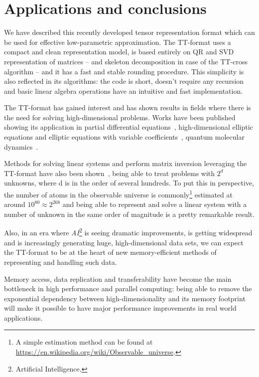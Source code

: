 \chapter{Applications and conclusions}
We have described this recently developed tensor representation format which can be used for effective low-parametric approximation.
The TT-format uses a compact and clean representation model, is based entirely on QR and SVD representation of matrices -- and skeleton decomposition in case of the TT-cross algorithm -- and it has a fast and stable rounding procedure.
This simplicity is also reflected in its algorithms: the code is short, doesn't require any recursion and basic linear algebra operations have an intuitive and fast implementation.

The TT-format has gained interest and has shown results in fields where there is the need for solving high-dimensional problems. Works have been published showing its application in partial differential equations~\cite{khoromskij2011qtt}, high-dimensional elliptic equations and elliptic equations with variable coefficients~\cite{dolgov2010tensor}, quantum molecular dynamics~\cite{khoromskij2010dmrg+}.

Methods for solving linear systems and perform matrix inversion leveraging the TT-format have also been shown~\cite{oseledets2012solution}, being able to treat problems with $2^d$ unknowns, where d is in the order of several hundreds. To put this in perspective, the number of atoms in the observable universe is commonly\footnote{A simple estimation method can be found at \href{https://en.wikipedia.org/wiki/Observable_universe}{https://en.wikipedia.org/wiki/Observable\_universe}.} estimated at around $10^{80} \approx 2^{268}$ and being able to represent and solve a linear system with a number of unknown in the same order of magnitude is a pretty remarkable result.

Also, in an era where \emph{AI}\footnote{Artificial Intelligence.} is seeing dramatic improvements, is getting widespread and is increasingly generating huge, high-dimensional data sets, we can expect the TT-format to be at the heart of new memory-efficient methods of representing and handling such data.

Memory access, data replication and transferability have become the main bottleneck in high performance and parallel computing: being able to remove the exponential dependency between high-dimensionality and its memory footprint will make it possible to have major performance improvements in real world applications.

